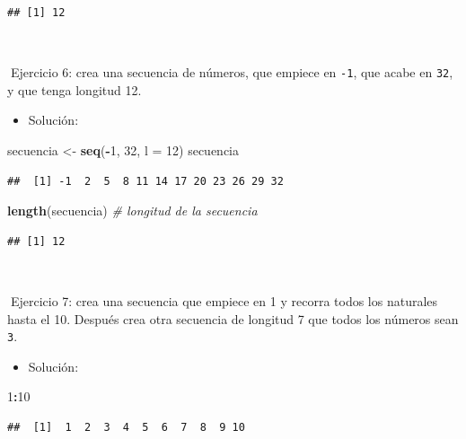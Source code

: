 \documentclass[11pt,]{book}
\newenvironment{Shaded}{\begin{snugshade}}{\end{snugshade}}
\newcommand{\CommentTok}[1]{\textcolor[rgb]{0.37,0.37,0.37}{\textit{#1}}}
\newcommand{\DataTypeTok}[1]{\textcolor[rgb]{0.27,0.27,0.27}{#1}}
\newcommand{\DecValTok}[1]{\textcolor[rgb]{0.06,0.06,0.06}{#1}}
\newcommand{\KeywordTok}[1]{\textcolor[rgb]{0.27,0.27,0.27}{\textbf{#1}}}
\newcommand{\NormalTok}[1]{#1}
\newcommand{\OperatorTok}[1]{\textcolor[rgb]{0.43,0.43,0.43}{\textbf{#1}}}
\newcommand{\StringTok}[1]{\textcolor[rgb]{0.5,0.5,0.5}{#1}}
\providecommand{\tightlist}{%
  \setlength{\itemsep}{0pt}\setlength{\parskip}{0pt}}
\begin{document}
\begin{verbatim}
## [1] 12
\end{verbatim}

~

📝Ejercicio 6: crea una secuencia de números, que empiece en \texttt{-1}, que acabe en \texttt{32}, y que tenga longitud 12.

\begin{itemize}
\tightlist
\item
  Solución:
\end{itemize}

\begin{Shaded}
\begin{Highlighting}[]
\NormalTok{secuencia <-}\StringTok{ }\KeywordTok{seq}\NormalTok{(}\OperatorTok{-}\DecValTok{1}\NormalTok{, }\DecValTok{32}\NormalTok{, }\DataTypeTok{l =} \DecValTok{12}\NormalTok{)}
\NormalTok{secuencia}
\end{Highlighting}
\end{Shaded}

\begin{verbatim}
##  [1] -1  2  5  8 11 14 17 20 23 26 29 32
\end{verbatim}

\begin{Shaded}
\begin{Highlighting}[]
\KeywordTok{length}\NormalTok{(secuencia) }\CommentTok{# longitud de la secuencia}
\end{Highlighting}
\end{Shaded}

\begin{verbatim}
## [1] 12
\end{verbatim}

~

📝Ejercicio 7: crea una secuencia que empiece en 1 y recorra todos los naturales hasta el 10. Después crea otra secuencia de longitud 7 que todos los números sean \texttt{3}.

\begin{itemize}
\tightlist
\item
  Solución:
\end{itemize}

\begin{Shaded}
\begin{Highlighting}[]
\DecValTok{1}\OperatorTok{:}\DecValTok{10}
\end{Highlighting}
\end{Shaded}

\begin{verbatim}
##  [1]  1  2  3  4  5  6  7  8  9 10
\end{verbatim}
\end{document}

